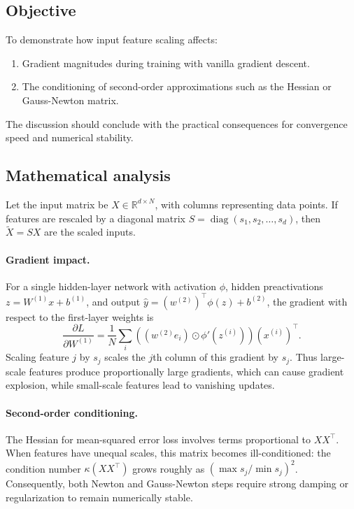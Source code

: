 \documentclass[11pt,a4paper]{article}
\begin{document}
\subsection*{Objective}
To demonstrate how input feature scaling affects:
\begin{enumerate}
  \item Gradient magnitudes during training with vanilla gradient descent.
  \item The conditioning of second-order approximations such as the Hessian or Gauss-Newton matrix.
\end{enumerate}
The discussion should conclude with the practical consequences for
convergence speed and numerical stability.

\subsection*{Mathematical analysis}

Let the input matrix be $X \in \mathbb{R}^{d \times N}$, with columns representing data points.
If features are rescaled by a diagonal matrix
$S = \operatorname{diag}(s_1, s_2, \dots, s_d)$, then
$\tilde{X} = S X$ are the scaled inputs.

\paragraph{Gradient impact.}
For a single hidden-layer network with activation $\phi$,
hidden preactivations $z = W^{(1)} x + b^{(1)}$, and output
$\hat{y} = (w^{(2)})^{\top} \phi(z) + b^{(2)}$, the gradient with respect to the first-layer weights is
\[
\frac{\partial L}{\partial W^{(1)}} =
\frac{1}{N} \sum_i
\left( (w^{(2)} e_i) \odot \phi'(z^{(i)}) \right)
(x^{(i)})^{\top}.
\]
Scaling feature $j$ by $s_j$ scales the $j$th column of this gradient by $s_j$.
Thus large-scale features produce proportionally large gradients, which can
cause gradient explosion, while small-scale features lead to vanishing updates.

\paragraph{Second-order conditioning.}
The Hessian for mean-squared error loss involves terms proportional to $X X^{\top}$.
When features have unequal scales, this matrix becomes ill-conditioned:
the condition number $\kappa(X X^{\top})$ grows roughly as
$(\max s_j / \min s_j)^2$.
Consequently, both Newton and Gauss-Newton steps require strong damping or
regularization to remain numerically stable.
\end{document}
